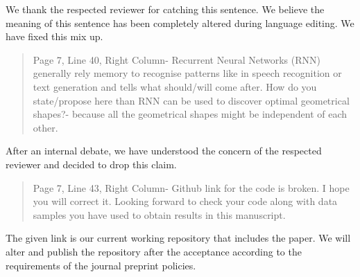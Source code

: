 \documentclass{article}
\begin{document}
	We thank the respected reviewer for catching this sentence. We believe the meaning of this sentence has been completely altered during language editing. We have fixed this mix up. 
	
	\begin{quote}
	Page 7, Line 40, Right Column- Recurrent Neural Networks (RNN) generally rely memory to recognise patterns like in speech recognition or text generation and tells what should/will come after. How do you state/propose here than RNN can be used to discover optimal geometrical shapes?- because all the geometrical shapes might be independent of each other.
	\end{quote}
	
	After an internal debate, we have understood the concern of the respected reviewer and decided to drop this claim.
	
	\begin{quote}
	Page 7, Line 43, Right Column- Github link for the code is broken. I hope you will correct it. Looking forward to check your code along with data samples you have used  to obtain results in this manuscript.
	\end{quote}
	
	The given link is our current working repository that includes the paper. We will alter and publish the repository after the acceptance according to the requirements of the journal preprint policies.
	
\end{document}
